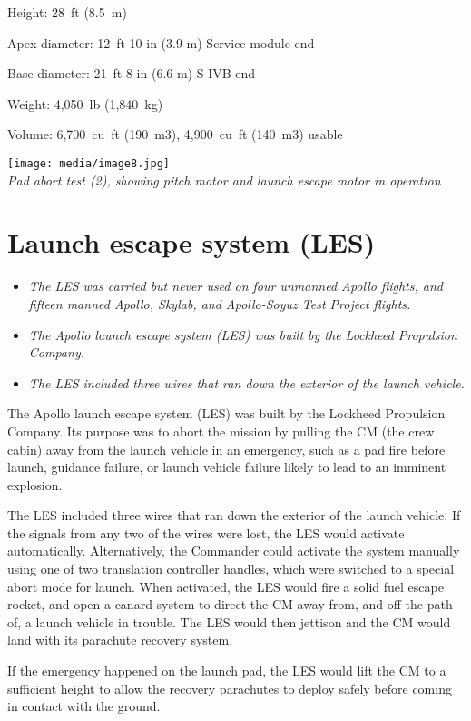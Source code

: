 Height: 28~ft (8.5~m)

Apex diameter: 12~ft 10 in (3.9 m) Service module end

Base diameter: 21~ft 8 in (6.6 m) S-IVB end

Weight: 4,050~lb (1,840~kg)

Volume: 6,700~cu~ft (190~m3), 4,900~cu~ft (140~m3) usable

\texttt{[image: media/image8.jpg]}\\
\emph{Pad abort test (2), showing pitch motor and launch escape motor in
operation}

\section{Launch escape system (LES)}\label{launch-escape-system-les}

\begin{itemize}
\item
  \emph{The LES was carried but never used on four unmanned Apollo
  flights, and fifteen manned Apollo, Skylab, and Apollo-Soyuz Test
  Project flights.}
\item
  \emph{The Apollo launch escape system (LES) was built by the Lockheed
  Propulsion Company.}
\item
  \emph{The LES included three wires that ran down the exterior of the
  launch vehicle.}
\end{itemize}

The Apollo launch escape system (LES) was built by the Lockheed
Propulsion Company. Its purpose was to abort the mission by pulling the
CM (the crew cabin) away from the launch vehicle in an emergency, such
as a pad fire before launch, guidance failure, or launch vehicle failure
likely to lead to an imminent explosion.

The LES included three wires that ran down the exterior of the launch
vehicle. If the signals from any two of the wires were lost, the LES
would activate automatically. Alternatively, the Commander could
activate the system manually using one of two translation controller
handles, which were switched to a special abort mode for launch. When
activated, the LES would fire a solid fuel escape rocket, and open a
canard system to direct the CM away from, and off the path of, a launch
vehicle in trouble. The LES would then jettison and the CM would land
with its parachute recovery system.

If the emergency happened on the launch pad, the LES would lift the CM
to a sufficient height to allow the recovery parachutes to deploy safely
before coming in contact with the ground.

